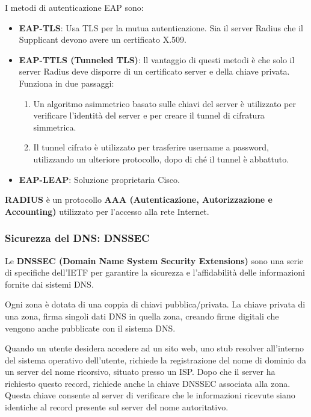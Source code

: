             I metodi di autenticazione EAP sono:
            \begin{itemize}
                \item \textbf{EAP-TLS}: Usa TLS per la mutua autenticazione. Sia il server Radius che il Supplicant devono avere un certificato X.509.
                \item \textbf{EAP-TTLS (Tunneled TLS)}: ll vantaggio di questi metodi è che solo il server Radius deve disporre di un certificato server e della chiave privata. Funziona in due passaggi:
                \begin{enumerate}
                    \item Un algoritmo asimmetrico basato sulle chiavi del server è utilizzato per verificare l'identità del server e per creare il tunnel di cifratura simmetrica.
                    \item Il tunnel cifrato è utilizzato per trasferire username a password, utilizzando un ulteriore protocollo, dopo di ché il tunnel è abbattuto.
                \end{enumerate}
                \item \textbf{EAP-LEAP}: Soluzione proprietaria Cisco.
            \end{itemize}

            \textbf{RADIUS} è un protocollo \textbf{AAA (Autenticazione, Autorizzazione e Accounting)} utilizzato per l'accesso alla rete Internet.

        \subsubsection{Sicurezza del DNS: DNSSEC}
            Le \textbf{DNSSEC (Domain Name System Security Extensions)} sono una serie di specifiche dell'IETF per garantire la sicurezza e l'affidabilità delle informazioni fornite dai sistemi DNS.

            Ogni zona è dotata di una coppia di chiavi pubblica/privata. La chiave privata di una zona, firma singoli dati DNS in quella zona, creando firme digitali che vengono anche pubblicate con il sistema DNS.

            Quando un utente desidera accedere ad un sito web, uno stub resolver all'interno del sistema operativo dell’utente, richiede la registrazione del nome di dominio da un server del nome ricorsivo, situato presso un ISP. Dopo che il server ha richiesto questo record, richiede anche la chiave DNSSEC associata alla zona. Questa chiave consente al server di verificare che le informazioni ricevute siano identiche al record presente sul server del nome autoritativo.